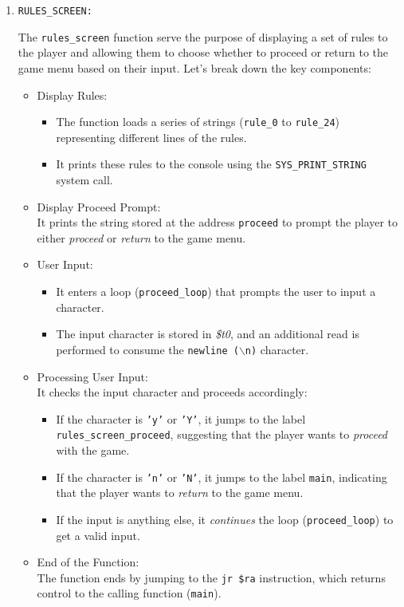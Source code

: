 \begin{enumerate}
    \item \large{\texttt{RULES\_SCREEN:}}
    
    \qquad The \texttt{rules\_screen} function serve the purpose of displaying a set of rules to the player and allowing them to choose whether to proceed or return to the game menu based on their input. Let's break down the key components:

    \begin{itemize}
        \item Display Rules:
        \begin{itemize}
            \item The function loads a series of strings (\texttt{rule\_0} to \texttt{rule\_24}) representing different lines of the rules.
            \item It prints these rules to the console using the \texttt{SYS\_PRINT\_STRING} system call.
        \end{itemize}
        \item Display Proceed Prompt: \\[6pt]
        It prints the string stored at the address \texttt{proceed} to prompt the player to either \textit{proceed} or \textit{return} to the game menu.
        \item User Input:
        \begin{itemize}
            \item It enters a loop (\texttt{proceed\_loop}) that prompts the user to input a character.
            \item The input character is stored in \textit{\$t0}, and an additional read is performed to consume the \texttt{newline ($\backslash$n)} character.
        \end{itemize}
        \item Processing User Input: \\[6pt]
        It checks the input character and proceeds accordingly:
        \begin{itemize}
            \item If the character is \texttt{'y'} or \texttt{'Y'}, it jumps to the label \texttt{rules\_screen\_proceed}, suggesting that the player wants to \textit{proceed} with the game.
            \item If the character is \texttt{'n'} or \texttt{'N'}, it jumps to the label \texttt{main}, indicating that the player wants to \textit{return} to the game menu.
            \item If the input is anything else, it \textit{continues} the loop (\texttt{proceed\_loop}) to get a valid input.
        \end{itemize}
        \item End of the Function: \\[6pt]
        The function ends by jumping to the \texttt{jr \$ra} instruction, which returns control to the calling function (\texttt{main}). \\
    \end{itemize}


\end{enumerate}
